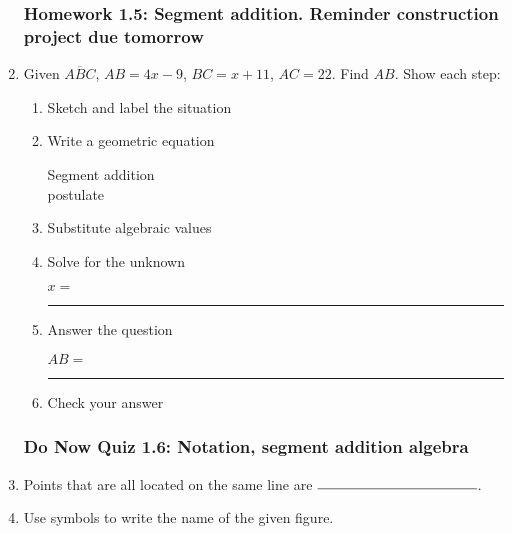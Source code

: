 \documentclass[12pt, oneside]{article}
\begin{document}
\begin{enumerate}
\subsubsection*{Homework 1.5: Segment addition. Reminder construction project due tomorrow}
\item Given $\overline{ABC}$, $AB=4x-9$, $BC=x+11$, $AC=22$. Find ${AB}$. Show each step:\\[0.5in]
  \begin{center}
  \end{center}
    \vspace{1cm}
  \begin{enumerate}
    \item Sketch and label the situation
    \item Write a geometric equation\\
    \begin{flushright} Segment addition\\ postulate \end{flushright}
    \item Substitute algebraic values
    \item Solve for the unknown \vspace{3cm}
    \begin{center} $x=$ \rule{1cm}{0.15mm} \end{center}
    \item Answer the question\\
    \begin{center} $AB=$ \rule{1cm}{0.15mm} \end{center}
    \item Check your answer
  \end{enumerate}

\newpage
\subsubsection*{Do Now Quiz 1.6: Notation, segment addition algebra}
\item Points that are all located on the same line are \qquad $\rule{4cm}{0.15mm}$.\bigskip

\item Use symbols to write the name of the given figure.
   \bigskip


\end{enumerate}
\end{document}
